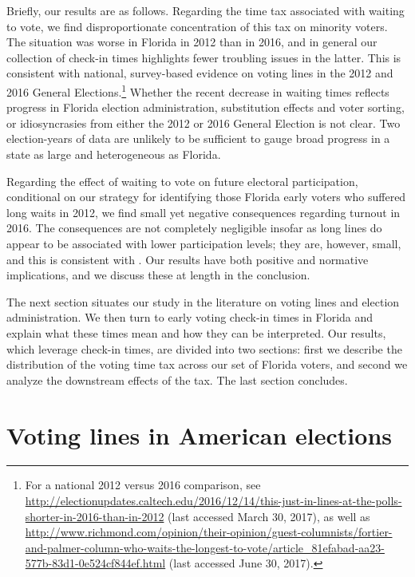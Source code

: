 \documentclass[12pt,titlepage]{article}
\begin{document}
Briefly, our results are as follows.  Regarding the time tax
associated with waiting to vote, we find disproportionate
concentration of this tax on minority voters.  The situation was worse
in Florida in 2012 than in 2016, and in general our collection of
check-in times highlights fewer troubling issues in the latter.  This
is consistent with national, survey-based evidence on voting lines in
the 2012 and 2016 General Elections.\footnote{For a national 2012
  versus 2016 comparison, see
  \url{http://electionupdates.caltech.edu/2016/12/14/this-just-in-lines-at-the-polls-shorter-in-2016-than-in-2012}
  (last accessed March 30, 2017), as well as
  \url{http://www.richmond.com/opinion/their-opinion/guest-columnists/fortier-and-palmer-column-who-waits-the-longest-to-vote/article_81efabad-aa23-577b-83d1-0e524cf844ef.html}
  (last accessed June 30, 2017).}  Whether the recent decrease in
waiting times reflects progress in Florida election administration,
substitution effects and voter sorting, or idiosyncrasies from either
the 2012 or 2016 General Election is not clear.  Two election-years of
data are unlikely to be sufficient to gauge broad progress in a state
as large and heterogeneous as Florida.

Regarding the effect of waiting to vote on future electoral
participation, conditional on our strategy for identifying those
Florida early voters who suffered long waits in 2012, we find small
yet negative consequences regarding turnout in 2016. The consequences
are not completely negligible insofar as long lines do appear to be
associated with lower participation levels; they are, however, small,
and this is consistent with
\citet{pettigrew:longlinesminorityprecincts}.  Our results have both
positive and normative implications, and we discuss these at length in
the conclusion.

The next section situates our study in the literature on voting lines
and election administration.  We then turn to early voting check-in
times in Florida and explain what these times mean and how they can be
interpreted.  Our results, which leverage check-in times, are divided
into two sections: first we describe the distribution of the voting
time tax across our set of Florida voters, and second we analyze the
downstream effects of the tax.  The last section concludes.

\section*{Voting lines in American elections}
\end{document}
